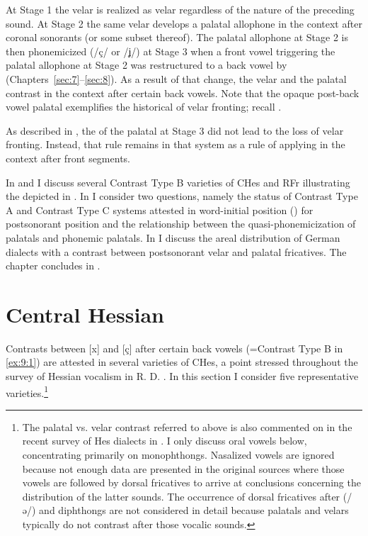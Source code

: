 At Stage 1 the velar is realized as velar regardless of the nature of the preceding sound. At Stage 2 the same velar develops a palatal allophone in the context after coronal sonorants (or some subset thereof). The palatal allophone at Stage 2 is then phonemicized (/ç/ or /ʝ/) at Stage 3 when a front vowel triggering the palatal allophone at Stage 2 was restructured to a back vowel by  (Chapters~\ref{sec:7}--\ref{sec:8}). As a result of that change, the velar and the palatal contrast in the context after certain back vowels. Note that the opaque post-back vowel palatal exemplifies the historical  of velar fronting; recall .

As described in , the  of the palatal at Stage 3 did not lead to the loss of velar fronting. Instead, that rule remains in that system as a rule of  applying in the context after front segments.

In  and  I discuss several Contrast Type B varieties of CHes and RFr illustrating the  depicted in . In  I consider two questions, namely the status of Contrast Type A and Contrast Type C systems attested in word-initial position () for postsonorant position and the relationship between the quasi-phonemicization of palatals and phonemic palatals. In  I discuss the areal distribution of German dialects with a contrast between postsonorant velar and palatal fricatives. The chapter concludes in .

\section{{Central} {Hessian}}\label{sec:9.2}

Contrasts between [x] and [ç] after certain back vowels (=Contrast Type B in \ref{ex:9:1}) are attested in several varieties of CHes, a point stressed throughout the survey of Hessian vocalism in R. D. \citet[30-34]{Hall1973}. In this section I consider five representative varieties.\footnote{{The palatal vs. velar contrast referred to above is also commented on in the recent survey of Hes dialects in \citet[447]{BirkenesFleischer2019}. I only discuss oral vowels below, concentrating primarily on monophthongs. Nasalized vowels are ignored because not enough data are presented in the original sources where those vowels are followed by dorsal fricatives to arrive at conclusions concerning the distribution of the latter sounds. The occurrence of dorsal fricatives after  (/ə/) and diphthongs are not considered in detail because palatals and velars typically do not contrast after those vocalic sounds.} }

